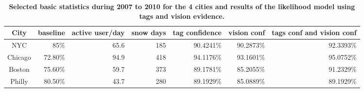 \begin{table*}\centering
{}
\caption {\textbf{Selected basic statistics during 2007 to 2010 for the 4 cities and results of the likelihood model using tags and vision evidence.}}
\label{tab:city_conf_tag_vision} 
\begin{tabular}{@{}crrrrrr@{}}\toprule
City &  baseline & active user/day  & snow days &  tag confidence &  vision conf & tags conf and vision conf \\\midrule
{NYC} & 85\% & 65.6 & 185 &90.4241\%&90.2873\% &92.3393\%\\
{Chicago} &72.80\% & 94.9 & 418 &94.1176\% &93.1601\% &95.0752\%  \\
{Boston} & 75.60\%& 59.7 & 373 &89.1781\%&85.2055\% & 91.2329\% \\
{Philly} & 80.50\% & 43.7 & 280 & 89.1929\% &85.0889\% & 89.1929\%  \\
\bottomrule
\end{tabular}
\vspace{-12pt}
\end{table*}
